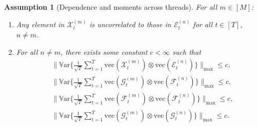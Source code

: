\documentclass[aos]{imsart}
\theoremstyle{plain}
\newtheorem{assumption}{Assumption}
\theoremstyle{definition}
\def\cE{\mathcal{E}}
\def\cF{\mathcal{F}}
\def\cG{\mathcal{G}} \def\cH{\boldsymbol{\mathcal{H}}} \def\cI{\mathcal{I}}
\def\cX{\mathcal{X}}
\def\var{\mathbb{V}\mathrm{ar}}
\def\vec{\mathrm{vec}}
\begin{document}
\begin{assumption}[Dependence and moments across threads]\label{ass: dependence_moment}
For all $m\in[M]$: 
\begin{enumerate}[itemsep=0pt, label = (\alph*), left = 0pt]
    \item Any element in $\cX_t^{(m)}$ is uncorrelated to those in $\cE_t^{(n)}$ for all $t\in[T]$, $n\neq m$.
    \item For all $n\neq m$, there exists some constant $c<\infty$ such that
    \begin{align*}
    & \Bigg\| \var\Bigg\{ \frac{1}{\sqrt{T}} \sum_{t=1}^T \vec(\cX_t^{(m)}) \otimes \vec(\cE_t^{(n)}) \Bigg\} \Bigg\|_{\max} \leq c , \\
    & \Bigg\| \var\Bigg\{ \frac{1}{\sqrt{T}} \sum_{t=1}^T \vec(\cG_t^{(m)}) \otimes \vec(\cF_t^{(n)}) \Bigg\} \Bigg\|_{\max} \leq c , \\
    & \Bigg\| \var\Bigg\{ \frac{1}{\sqrt{T}} \sum_{t=1}^T \vec(\cF_t^{(m)}) \otimes \vec(\cF_t^{(n)}) \Bigg\} \Bigg\|_{\max} \leq c , \\
    & \Bigg\| \var\Bigg\{ \frac{1}{\sqrt{T}} \sum_{t=1}^T \vec(\cG_t^{(m)}) \otimes \vec(\cG_t^{(n)}) \Bigg\} \Bigg\|_{\max} \leq c .
    \end{align*}
\end{enumerate}
\end{assumption}
\end{document}
